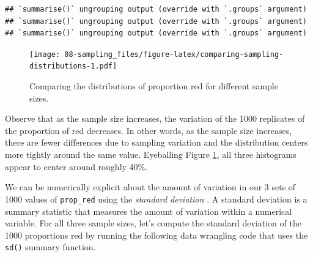 \documentclass[
]{book}
\newenvironment{Shaded}{\begin{snugshade}}{\end{snugshade}}
\newcommand{\CommentTok}[1]{\textcolor[rgb]{0.56,0.35,0.01}{\textit{#1}}}
\newcommand{\DataTypeTok}[1]{\textcolor[rgb]{0.13,0.29,0.53}{#1}}
\newcommand{\DecValTok}[1]{\textcolor[rgb]{0.00,0.00,0.81}{#1}}
\newcommand{\KeywordTok}[1]{\textcolor[rgb]{0.13,0.29,0.53}{\textbf{#1}}}
\newcommand{\NormalTok}[1]{#1}
\newcommand{\OperatorTok}[1]{\textcolor[rgb]{0.81,0.36,0.00}{\textbf{#1}}}
\newcommand{\StringTok}[1]{\textcolor[rgb]{0.31,0.60,0.02}{#1}}
\begin{document}
\begin{verbatim}
## `summarise()` ungrouping output (override with `.groups` argument)
## `summarise()` ungrouping output (override with `.groups` argument)
## `summarise()` ungrouping output (override with `.groups` argument)
\end{verbatim}

\begin{figure}
\centering
\texttt{[image: 08-sampling\_files/figure-latex/comparing-sampling-distributions-1.pdf]}
\caption{\label{fig:comparing-sampling-distributions}Comparing the distributions of proportion red for different sample sizes.}
\end{figure}

Observe that as the sample size increases, the variation of the 1000 replicates of the proportion of red decreases. In other words, as the sample size increases, there are fewer differences due to sampling variation and the distribution centers more tightly around the same value. Eyeballing Figure \ref{fig:comparing-sampling-distributions}, all three histograms appear to center around roughly 40\%.

We can be numerically explicit about the amount of variation in our 3 sets of 1000 values of \texttt{prop\_red} using the \emph{standard deviation} . A standard deviation is a summary statistic that measures the amount of variation within a numerical variable. For all three sample sizes, let's compute the standard deviation of the 1000 proportions red by running the following data wrangling code that uses the \texttt{sd()} summary function.

\begin{Shaded}
\end{Shaded}
\end{document}

